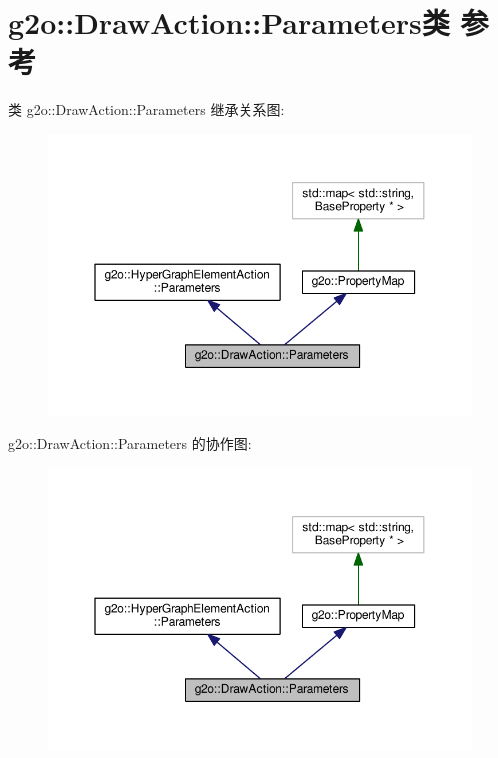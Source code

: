 \hypertarget{classg2o_1_1DrawAction_1_1Parameters}{\section{g2o\-:\-:Draw\-Action\-:\-:Parameters类 参考}
\label{classg2o_1_1DrawAction_1_1Parameters}
}


类 g2o\-:\-:Draw\-Action\-:\-:Parameters 继承关系图\-:
\nopagebreak
\begin{figure}[H]
\begin{center}
\leavevmode
\includegraphics[width=350pt]{classg2o_1_1DrawAction_1_1Parameters__inherit__graph}
\end{center}
\end{figure}


g2o\-:\-:Draw\-Action\-:\-:Parameters 的协作图\-:
\nopagebreak
\begin{figure}[H]
\begin{center}
\leavevmode
\includegraphics[width=350pt]{classg2o_1_1DrawAction_1_1Parameters__coll__graph}
\end{center}
\end{figure}
